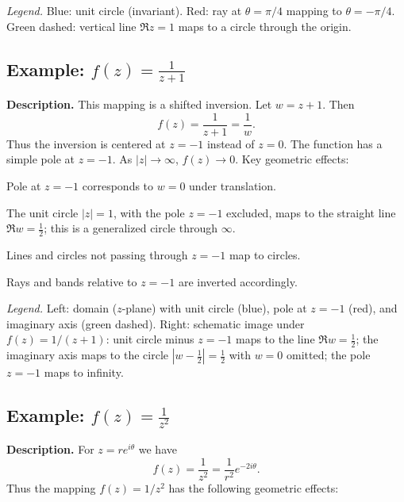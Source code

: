 \begin{problem}[CP-IV-0110]
\begin{center}
	\hspace{1.5cm}

\end{center}

\textit{Legend.}
Blue: unit circle (invariant).
Red: ray at $\theta=\pi/4$ mapping to $\theta=-\pi/4$.
Green dashed: vertical line $\Re z=1$ maps to a circle through the origin.

\subsection*{Example: $f(z)=\tfrac{1}{z+1}$}

\textbf{Description.}
This mapping is a shifted inversion. Let $w=z+1$. Then
\[
f(z) = \frac{1}{z+1} = \frac{1}{w}.
\]
Thus the inversion is centered at $z=-1$ instead of $z=0$.
The function has a simple pole at $z=-1$.
As $|z|\to\infty$, $f(z)\to 0$.
Key geometric effects:

	\par\noindent\textbullet\quad Pole at $z=-1$ corresponds to $w=0$ under translation.
	\par\noindent\textbullet\quad The unit circle $|z|=1$, with the pole $z=-1$ excluded, maps to the straight line $\Re w=\tfrac12$; this is a generalized circle through $\infty$.
	\par\noindent\textbullet\quad Lines and circles not passing through $z=-1$ map to circles.
	\par\noindent\textbullet\quad Rays and bands relative to $z=-1$ are inverted accordingly.

\begin{center}

	\hspace{1.5cm}

\end{center}

\textit{Legend.}
Left: domain ($z$-plane) with unit circle (blue), pole at $z=-1$ (red), and imaginary axis (green dashed).
Right: schematic image under $f(z)=1/(z+1)$: unit circle minus $z=-1$ maps to the line $\Re w=\tfrac12$; the imaginary axis maps to the circle $|w-\tfrac12|=\tfrac12$ with $w=0$ omitted; the pole $z=-1$ maps to infinity.

\subsection*{Example: $f(z)=\tfrac{1}{z^2}$}

\textbf{Description.}
For $z = re^{i\theta}$ we have
\[
f(z) = \frac{1}{z^2} = \frac{1}{r^2} e^{-2i\theta}.
\]
Thus the mapping $f(z)=1/z^2$ has the following geometric effects:


\end{problem}
